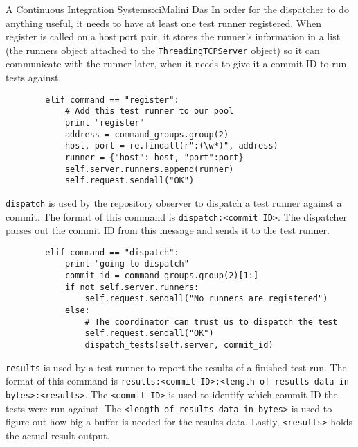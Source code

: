 \begin{aosachapter}{A Continuous Integration System}{s:ci}{Malini Das}
In order for the dispatcher to do anything useful, it needs to have at
least one test runner registered. When register is called on a host:port
pair, it stores the runner's information in a list (the runners object
attached to the \texttt{ThreadingTCPServer} object) so it can
communicate with the runner later, when it needs to give it a commit ID
to run tests against.

\begin{verbatim}
        elif command == "register":
            # Add this test runner to our pool
            print "register"
            address = command_groups.group(2)
            host, port = re.findall(r":(\w*)", address)
            runner = {"host": host, "port":port}
            self.server.runners.append(runner)
            self.request.sendall("OK")
\end{verbatim}

\texttt{dispatch} is used by the repository observer to dispatch a test
runner against a commit. The format of this command is
\texttt{dispatch:\textless{}commit ID\textgreater{}}. The dispatcher
parses out the commit ID from this message and sends it to the test
runner.

\begin{verbatim}
        elif command == "dispatch":
            print "going to dispatch"
            commit_id = command_groups.group(2)[1:]
            if not self.server.runners:
                self.request.sendall("No runners are registered")
            else:
                # The coordinator can trust us to dispatch the test
                self.request.sendall("OK")
                dispatch_tests(self.server, commit_id)
\end{verbatim}

\texttt{results} is used by a test runner to report the results of a
finished test run. The format of this command is
\texttt{results:\textless{}commit ID\textgreater{}:\textless{}length of results data in bytes\textgreater{}:\textless{}results\textgreater{}}.
The \texttt{\textless{}commit ID\textgreater{}} is used to identify
which commit ID the tests were run against. The
\texttt{\textless{}length of results data in bytes\textgreater{}} is
used to figure out how big a buffer is needed for the results data.
Lastly, \texttt{\textless{}results\textgreater{}} holds the actual
result output.


\end{aosachapter}
